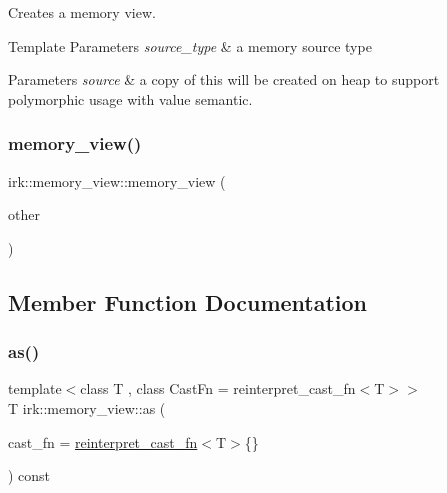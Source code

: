 Creates a memory view. 


\begin{DoxyTemplParams}{Template Parameters}
{\em source\+\_\+type} & a memory source type \\
\hline
\end{DoxyTemplParams}

\begin{DoxyParams}{Parameters}
{\em source} & a copy of this will be created on heap to support polymorphic usage with value semantic. \\
\hline
\end{DoxyParams}
\mbox{\label{classirk_1_1memory__view_a10acf8933d8a6e57295c27c73adce179}} 
\subsubsection{\texorpdfstring{memory\+\_\+view()}{memory\_view()}\hspace{0.1cm}{\footnotesize\ttfamily [2/2]}}
{\footnotesize\ttfamily irk\+::memory\+\_\+view\+::memory\+\_\+view (\begin{DoxyParamCaption}\item[{const \mbox{\hyperlink{classirk_1_1memory__view}{memory\+\_\+view}} \&}]{other }\end{DoxyParamCaption})\hspace{0.3cm}{\ttfamily [default]}}



\subsection{Member Function Documentation}
\mbox{\label{classirk_1_1memory__view_ae9d042dabe259ef35ac2fec319c40b57}} 
\subsubsection{\texorpdfstring{as()}{as()}}
{\footnotesize\ttfamily template$<$class T , class Cast\+Fn  = reinterpret\+\_\+cast\+\_\+fn$<$\+T$>$$>$ \\
T irk\+::memory\+\_\+view\+::as (\begin{DoxyParamCaption}\item[{Cast\+Fn}]{cast\+\_\+fn = {\ttfamily \mbox{\hyperlink{structirk_1_1reinterpret__cast__fn}{reinterpret\+\_\+cast\+\_\+fn}}$<$T$>$\{\}} }\end{DoxyParamCaption}) const\hspace{0.3cm}{\ttfamily [inline]}}

